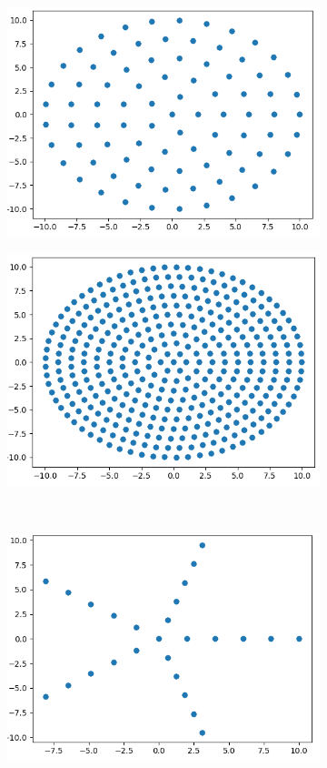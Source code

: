 \begin{figure}
\begin{subfigure}{.5\textwidth}
  \centering
  \includegraphics[width=.8\linewidth]{Zdjecia/5/siatka1}
  \caption{}
  \label{fig:sfig1}
\end{subfigure}%
\begin{subfigure}{.5\textwidth}
  \centering
  \includegraphics[width=.8\linewidth]{Zdjecia/5/siatka2}
  \caption{}
  \label{fig:sfig2}
\end{subfigure}\\
\begin{subfigure}{.5\textwidth}
  \centering
  \includegraphics[width=.8\linewidth]{Zdjecia/5/siatka3}

\end{subfigure}
\end{figure}
